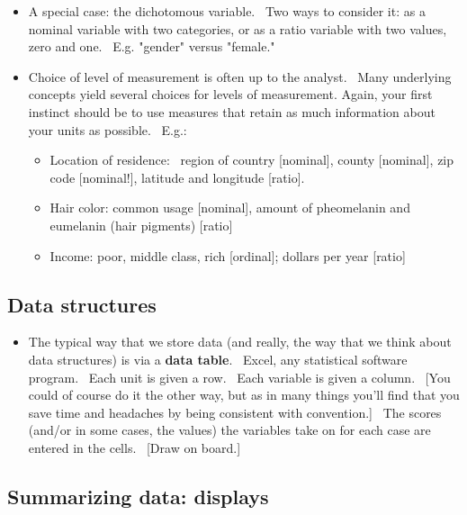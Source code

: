 \documentclass[11pt]{article}
\begin{document}
\begin{itemize}
\item A special case: the dichotomous variable. \ Two ways to consider it:
as a nominal variable with two categories, or as a ratio variable with two
values, zero and one. \ E.g. "gender" versus "female."

\item Choice of level of measurement is often up to the analyst. \ Many
underlying concepts yield several choices for levels of measurement. Again,
your first instinct should be to use measures that retain as much
information about your units as possible. \ E.g.:

\begin{itemize}
\item Location of residence: \ region of country [nominal], county
[nominal], zip code [nominal!], latitude and longitude [ratio].

\item Hair color: common usage [nominal], amount of pheomelanin and
eumelanin (hair pigments) [ratio]

\item Income: poor, middle class, rich [ordinal]; dollars per year [ratio]
\end{itemize}
\end{itemize}

\subsection{Data structures}

\begin{itemize}
\item The typical way that we store data (and really, the way that we think
about data structures) is via a \textbf{data table}. \ Excel, any
statistical software program. \ Each unit is given a row. \ Each variable is
given a column. \ [You could of course do it the other way, but as in many
things you'll find that you save time and headaches by being consistent with
convention.] \ The scores (and/or in some cases, the values) the variables
take on for each case are entered in the cells. \ [Draw on board.]
\end{itemize}

\subsection{Summarizing data: displays}
\end{document}
